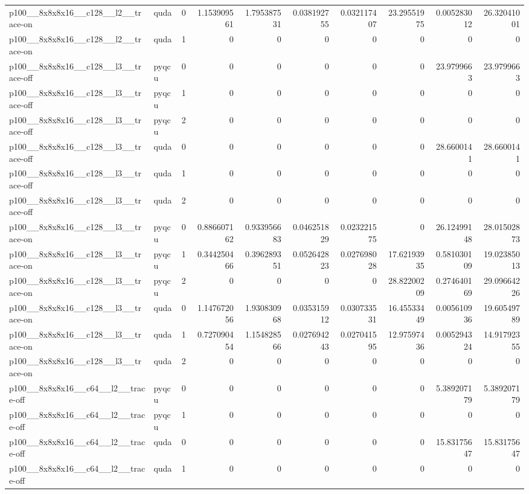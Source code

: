 \begin{table}[htbp]
\begin{tabular}{@{}llrrrrrrrr@{}}
p100\_\_8x8x8x16\_\_c128\_\_l2\_\_trace-on & quda & 0 & 1.153909561 & 1.795387531 & 0.038192755 & 0.032117407 & 23.29551975 & 0.005283012 & 26.32041001 \\
p100\_\_8x8x8x16\_\_c128\_\_l2\_\_trace-on & quda & 1 & 0 & 0 & 0 & 0 & 0 & 0 & 0 \\
p100\_\_8x8x8x16\_\_c128\_\_l3\_\_trace-off & pyqcu & 0 & 0 & 0 & 0 & 0 & 0 & 23.9799663 & 23.9799663 \\
p100\_\_8x8x8x16\_\_c128\_\_l3\_\_trace-off & pyqcu & 1 & 0 & 0 & 0 & 0 & 0 & 0 & 0 \\
p100\_\_8x8x8x16\_\_c128\_\_l3\_\_trace-off & pyqcu & 2 & 0 & 0 & 0 & 0 & 0 & 0 & 0 \\
p100\_\_8x8x8x16\_\_c128\_\_l3\_\_trace-off & quda & 0 & 0 & 0 & 0 & 0 & 0 & 28.6600141 & 28.6600141 \\
p100\_\_8x8x8x16\_\_c128\_\_l3\_\_trace-off & quda & 1 & 0 & 0 & 0 & 0 & 0 & 0 & 0 \\
p100\_\_8x8x8x16\_\_c128\_\_l3\_\_trace-off & quda & 2 & 0 & 0 & 0 & 0 & 0 & 0 & 0 \\
p100\_\_8x8x8x16\_\_c128\_\_l3\_\_trace-on & pyqcu & 0 & 0.886607162 & 0.933956683 & 0.046251829 & 0.023221575 & 0 & 26.12499148 & 28.01502873 \\
p100\_\_8x8x8x16\_\_c128\_\_l3\_\_trace-on & pyqcu & 1 & 0.344250466 & 0.396289351 & 0.052642823 & 0.027698028 & 17.62193935 & 0.581030109 & 19.02385013 \\
p100\_\_8x8x8x16\_\_c128\_\_l3\_\_trace-on & pyqcu & 2 & 0 & 0 & 0 & 0 & 28.82200209 & 0.274640169 & 29.09664226 \\
p100\_\_8x8x8x16\_\_c128\_\_l3\_\_trace-on & quda & 0 & 1.147672056 & 1.930830968 & 0.035315912 & 0.030733531 & 16.45533449 & 0.005610936 & 19.60549789 \\
p100\_\_8x8x8x16\_\_c128\_\_l3\_\_trace-on & quda & 1 & 0.727090454 & 1.154828566 & 0.027694243 & 0.027041595 & 12.97597436 & 0.005294324 & 14.91792355 \\
p100\_\_8x8x8x16\_\_c128\_\_l3\_\_trace-on & quda & 2 & 0 & 0 & 0 & 0 & 0 & 0 & 0 \\
p100\_\_8x8x8x16\_\_c64\_\_l2\_\_trace-off & pyqcu & 0 & 0 & 0 & 0 & 0 & 0 & 5.389207179 & 5.389207179 \\
p100\_\_8x8x8x16\_\_c64\_\_l2\_\_trace-off & pyqcu & 1 & 0 & 0 & 0 & 0 & 0 & 0 & 0 \\
p100\_\_8x8x8x16\_\_c64\_\_l2\_\_trace-off & quda & 0 & 0 & 0 & 0 & 0 & 0 & 15.83175647 & 15.83175647 \\
p100\_\_8x8x8x16\_\_c64\_\_l2\_\_trace-off & quda & 1 & 0 & 0 & 0 & 0 & 0 & 0 & 0 \\

\end{tabular}
\end{table}
